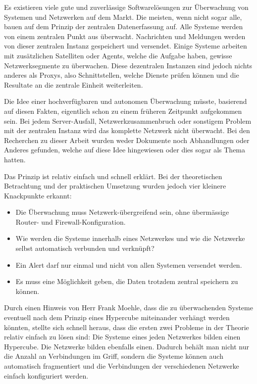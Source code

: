 
Es existieren viele gute und zuverl\"assige Softwarel\"osungen zur \"Uberwachung von Systemen und Netzwerken auf dem Markt. Die meisten, wenn nicht sogar alle, bauen auf dem Prinzip der zentralen Datenerfassung auf. Alle Systeme werden von einem zentralen Punkt aus \"uberwacht. Nachrichten und Meldungen werden von dieser zentralen Instanz gespeichert und versendet. Einige Systeme arbeiten mit zus\"atzlichen Satelliten oder Agents, welche die Aufgabe haben, gewisse Netzwerksegmente zu \"uberwachen. Diese dezentralen Instanzen sind jedoch nichts anderes als Proxys, also Schnittstellen, welche Dienste pr\"ufen k\"onnen und die Resultate an die zentrale Einheit weiterleiten.

Die Idee einer hochverf\"ugbaren und autonomen \"Uberwachung m\"usste, basierend auf diesen Fakten, eigentlich schon zu einem fr\"uheren Zeitpunkt aufgekommen sein. Bei jedem Server-Ausfall, Netzwerkzusammenbruch oder sonstigem Problem mit der zentralen Instanz wird das komplette Netzwerk nicht \"uberwacht. Bei den Recherchen zu dieser Arbeit wurden weder Dokumente noch Abhandlungen oder Anderes gefunden, welche auf diese Idee hingewiesen oder dies sogar als Thema hatten.

Das Prinzip ist relativ einfach und schnell erkl\"art. Bei der theoretischen Betrachtung und der praktischen Umsetzung wurden jedoch vier kleinere Knackpunkte erkannt:
\begin{itemize}
 \item Die \"Uberwachung muss Netzwerk-\"ubergreifend sein, ohne \"uberm\"assige Router- und Firewall-Konfiguration.
 \item Wie werden die Systeme innerhalb eines Netzwerkes und wie die Netzwerke selbst automatisch verbunden und verkn\"upft?
 \item Ein Alert darf nur einmal und nicht von allen Systemen versendet werden.
 \item Es muss eine M\"oglichkeit geben, die Daten trotzdem zentral speichern zu k\"onnen.
\end{itemize}

Durch einen Hinweis von Herr Frank Moehle, dass die zu \"uberwachenden Systeme eventuell nach dem Prinzip eines Hypercube miteinander verh\"angt werden k\"onnten, stellte sich schnell heraus, dass die ersten zwei Probleme in der Theorie relativ einfach zu l\"osen sind: Die Systeme eines jeden Netzwerkes bilden einen Hypercube. Die Netzwerke bilden ebenfalls einen. Dadurch beh\"alt man nicht nur die Anzahl an Verbindungen im Griff, sondern die Systeme k\"onnen auch automatisch fragmentiert und die Verbindungen der verschiedenen Netzwerke einfach konfiguriert werden.

